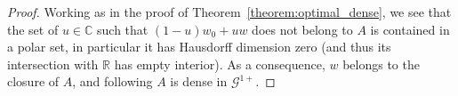 \documentclass[AHL,Unicode,longabstracts,published]{cedram}
\newcommand{\clG}{\mathcal{G}}
\newcommand{\bbC}{\mathbb{C}}
\newcommand{\bbR}{\mathbb{R}}
\begin{document}
\begin{proof}
Working as in the proof of Theorem~\ref{theorem:optimal_dense}, we see that the set of $u \in \bbC$ such that $(1-u) w_0 + u w$ does not belong to $A$ is contained in a polar set, in particular it has Hausdorff dimension zero (and thus its intersection with $\bbR$ has empty interior). As a consequence, $w$ belongs to the closure of $A$, and following $A$ is dense in $\clG^{1+}$.
\end{proof}
\vspace*{30pt}

\break



\end{document}
